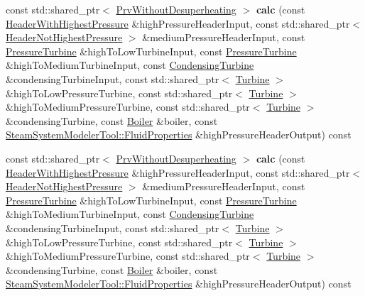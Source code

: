 \begin{DoxyCompactItemize}
const std\+::shared\+\_\+ptr$<$ \hyperlink{class_prv_without_desuperheating}{Prv\+Without\+Desuperheating} $>$ {\bfseries calc} (const \hyperlink{class_header_with_highest_pressure}{Header\+With\+Highest\+Pressure} \&high\+Pressure\+Header\+Input, const std\+::shared\+\_\+ptr$<$ \hyperlink{class_header_not_highest_pressure}{Header\+Not\+Highest\+Pressure} $>$ \&medium\+Pressure\+Header\+Input, const \hyperlink{class_pressure_turbine}{Pressure\+Turbine} \&high\+To\+Low\+Turbine\+Input, const \hyperlink{class_pressure_turbine}{Pressure\+Turbine} \&high\+To\+Medium\+Turbine\+Input, const \hyperlink{class_condensing_turbine}{Condensing\+Turbine} \&condensing\+Turbine\+Input, const std\+::shared\+\_\+ptr$<$ \hyperlink{class_turbine}{Turbine} $>$ \&high\+To\+Low\+Pressure\+Turbine, const std\+::shared\+\_\+ptr$<$ \hyperlink{class_turbine}{Turbine} $>$ \&high\+To\+Medium\+Pressure\+Turbine, const std\+::shared\+\_\+ptr$<$ \hyperlink{class_turbine}{Turbine} $>$ \&condensing\+Turbine, const \hyperlink{class_boiler}{Boiler} \&boiler, const \hyperlink{struct_steam_system_modeler_tool_1_1_fluid_properties}{Steam\+System\+Modeler\+Tool\+::\+Fluid\+Properties} \&high\+Pressure\+Header\+Output) const
\item 
\mbox{\label{class_high_to_medium_prv_calculator_adba00fd52835eff7a38c509d0de1d5dd}} 
const std\+::shared\+\_\+ptr$<$ \hyperlink{class_prv_without_desuperheating}{Prv\+Without\+Desuperheating} $>$ {\bfseries calc} (const \hyperlink{class_header_with_highest_pressure}{Header\+With\+Highest\+Pressure} \&high\+Pressure\+Header\+Input, const std\+::shared\+\_\+ptr$<$ \hyperlink{class_header_not_highest_pressure}{Header\+Not\+Highest\+Pressure} $>$ \&medium\+Pressure\+Header\+Input, const \hyperlink{class_pressure_turbine}{Pressure\+Turbine} \&high\+To\+Low\+Turbine\+Input, const \hyperlink{class_pressure_turbine}{Pressure\+Turbine} \&high\+To\+Medium\+Turbine\+Input, const \hyperlink{class_condensing_turbine}{Condensing\+Turbine} \&condensing\+Turbine\+Input, const std\+::shared\+\_\+ptr$<$ \hyperlink{class_turbine}{Turbine} $>$ \&high\+To\+Low\+Pressure\+Turbine, const std\+::shared\+\_\+ptr$<$ \hyperlink{class_turbine}{Turbine} $>$ \&high\+To\+Medium\+Pressure\+Turbine, const std\+::shared\+\_\+ptr$<$ \hyperlink{class_turbine}{Turbine} $>$ \&condensing\+Turbine, const \hyperlink{class_boiler}{Boiler} \&boiler, const \hyperlink{struct_steam_system_modeler_tool_1_1_fluid_properties}{Steam\+System\+Modeler\+Tool\+::\+Fluid\+Properties} \&high\+Pressure\+Header\+Output) const
\end{DoxyCompactItemize}


